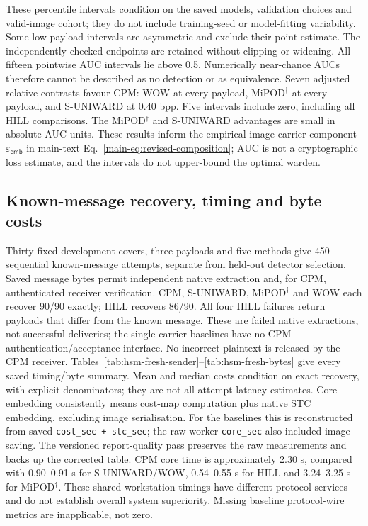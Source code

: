 \documentclass[journal]{IEEEtran}
\theoremstyle{definition}
\theoremstyle{game}
\begin{document}
These percentile intervals condition on the saved models, validation
choices and valid-image cohort; they do not include training-seed or
model-fitting variability. Some low-payload intervals are asymmetric and
exclude their point estimate. The independently checked endpoints are
retained without clipping or widening. All fifteen pointwise AUC
intervals lie above 0.5. Numerically near-chance AUCs therefore cannot be
described as no detection or as equivalence. Seven adjusted relative
contrasts favour CPM: WOW at every payload, MiPOD$^\dagger$ at every
payload, and S-UNIWARD at 0.40 bpp. Five intervals include zero, including
all HILL comparisons. The MiPOD$^\dagger$ and S-UNIWARD advantages are
small in absolute AUC units. These results inform the empirical
image-carrier component $\varepsilon_{\mathsf{emb}}$ in main-text
Eq.~\eqref{main-eq:revised-composition}; AUC is not a cryptographic loss
estimate, and the intervals do not upper-bound the optimal warden.

\subsection{Known-message recovery, timing and byte costs}
Thirty fixed development covers, three payloads and five methods give
450 sequential known-message attempts, separate from held-out detector
selection. Saved message bytes permit independent native extraction and,
for CPM, authenticated receiver verification. CPM, S-UNIWARD,
MiPOD$^\dagger$ and WOW each recover 90/90 exactly; HILL recovers 86/90.
All four HILL failures return payloads that differ from the known message.
These are failed native extractions, not successful deliveries; the
single-carrier baselines have no CPM authentication/acceptance interface.
No incorrect plaintext is released by the CPM receiver.
Tables~\ref{tab:hsm-fresh-sender}--\ref{tab:hsm-fresh-bytes} give every
saved timing/byte summary. Mean and median costs condition on exact
recovery, with explicit denominators; they are not all-attempt latency
estimates. Core embedding consistently means cost-map computation plus
native STC embedding, excluding image serialisation. For the baselines
this is reconstructed from saved \texttt{cost\_sec + stc\_sec}; the raw
worker \texttt{core\_sec} also included image saving. The versioned
report-quality pass preserves the raw measurements and backs up the
corrected table. CPM core time is approximately 2.30 s, compared with
0.90--0.91 s for S-UNIWARD/WOW, 0.54--0.55 s for HILL and 3.24--3.25 s
for MiPOD$^\dagger$. These shared-workstation timings have different
protocol services and do not establish overall system superiority.
Missing baseline protocol-wire metrics are inapplicable, not zero.
\end{document}
